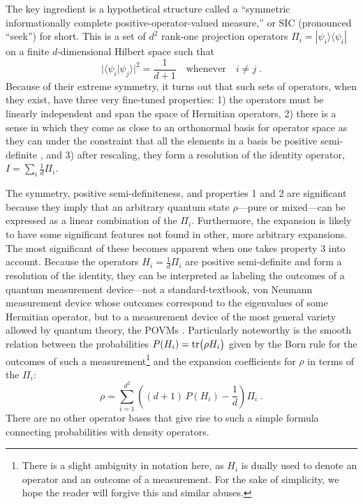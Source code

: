 \documentclass[aps,pra,superscriptaddress,10pt,tightenlines,twocolumn,nofootinbib]{revtex4}
\begin{document}
The key ingredient is a hypothetical structure called a ``symmetric informationally complete positive-operator-valued measure,'' or SIC (pronounced ``seek'') for short.  This is a set of $d^2$ rank-one projection operators $\Pi_i=|\psi_i\rangle\langle\psi_i|$ on a finite $d$-dimensional Hilbert space such that
\begin{equation}
\big|\langle\psi_i|\psi_j\rangle\big|^2=\frac{1}{d+1}\quad \mbox{whenever} \quad i\ne j\;.
\label{Mojo}
\end{equation}
Because of their extreme symmetry, it turns out that such sets of operators, when they exist, have three very fine-tuned properties: 1) the operators must be linearly independent and span the space of Hermitian operators, 2) there is a sense in which they come as close to an orthonormal basis for operator space as they can under the constraint that all the elements in a basis be positive semi-definite \cite{Appleby07}, and 3) after rescaling, they form a resolution of the identity operator, $I=\sum_i \frac{1}{d}\Pi_i$.

The symmetry, positive semi-definiteness, and properties 1 and 2 are significant because they imply that an arbitrary quantum state $\rho$---pure or mixed---can be expressed as a linear combination of the $\Pi_i$.  Furthermore, the expansion is likely to have some significant features not found in other, more arbitrary expansions.  The most significant of these becomes apparent when one takes property 3 into account.  Because the operators $H_i=\frac1d \Pi_i$ are positive semi-definite and form a resolution of the identity, they can be interpreted as labeling the outcomes of a quantum measurement device---not a standard-textbook, von Neumann measurement device whose outcomes correspond to the eigenvalues of some Hermitian operator, but to a measurement device of the most general variety allowed by quantum theory, the POVMs \cite{Nielsen00,Peres95}.  Particularly noteworthy is the smooth relation between the probabilities $P(H_i)={\rm tr}\big(\rho H_i\big)$ given by the Born rule for the outcomes of such a measurement\footnote{There is a slight ambiguity in notation here, as $H_i$ is dually used to denote an operator and an outcome of a measurement. For the sake of simplicity, we hope the reader will forgive this and similar abuses.}
and the expansion coefficients for $\rho$ in terms of the $\Pi_i$:
\begin{equation}
\rho = \sum_{i=1}^{d^2}\left( (d+1)\,P(H_i) - \frac1d \right)\Pi_i\;.
\label{Ralph}
\end{equation}
There are no other operator bases that give rise to such a simple formula connecting probabilities with density operators.
\end{document}
